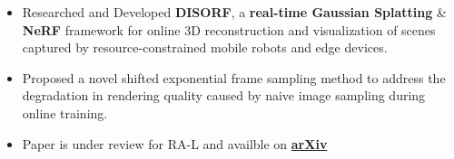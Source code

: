\documentclass[10pt,a4paper,ragged2e,withhyper]{altacv}
\begin{document}
\begin{paracol}{2}
\begin{itemize}

    \end{itemize}

    \switchcolumn{}

    \begin{itemize}
        \item Researched and Developed \textbf{DISORF}, a \textbf{real-time Gaussian Splatting} \& \textbf{NeRF} framework for online 3D
              reconstruction and visualization of scenes captured by resource-constrained mobile robots and edge devices.
        \item Proposed a novel shifted exponential frame sampling method to address the degradation in rendering quality caused by naive image sampling during online training.
        \item Paper is under review for RA-L and availble on \href{https://arxiv.org/abs/2403.00228}{\textbf{arXiv}}
    \end{itemize}







\end{paracol}
\end{document}
